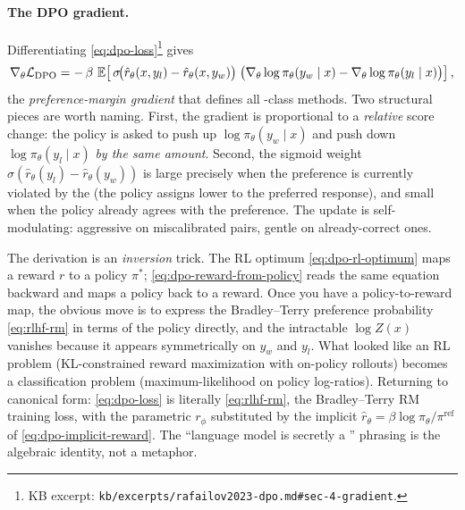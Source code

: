 \paragraph{The DPO gradient.} Differentiating
\cref{eq:dpo-loss}\footnote{KB excerpt:
\texttt{kb/excerpts/rafailov2023-dpo.md\#sec-4-gradient}.} gives
\citep[\S 4]{rafailov2023-dpo}
\begin{equation}
\nabla_\theta \mathcal{L}_{\mathrm{DPO}}
  = -\, \beta\, \operatorname{\mathbb{E}}\!\left[\,
       \sigma\!\big(\hat{r}_\theta(x, y_l) - \hat{r}_\theta(x, y_w)\big)
       \;\big(\nabla_\theta \log \pi_\theta(y_w \mid x)
              - \nabla_\theta \log \pi_\theta(y_l \mid x)\big)
     \right],
\label{eq:dpo-gradient}
\end{equation}
the \emph{preference-margin gradient} that defines all -class
methods. Two structural pieces are worth naming. First, the gradient is
proportional to a \emph{relative} score change: the policy is asked to
push up $\log \pi_\theta(y_w \mid x)$ and push down
$\log \pi_\theta(y_l \mid x)$ \emph{by the same amount}. Second, the
sigmoid weight $\sigma(\hat r_\theta(y_l) - \hat r_\theta(y_w))$ is
large precisely when the preference is currently violated by the
 (the policy assigns lower  to the
preferred response), and small when the policy already agrees with the
preference. The update is self-modulating: aggressive on
miscalibrated pairs, gentle on already-correct ones.

\begin{intuition}
The  derivation is an \emph{inversion} trick. The RL optimum
\cref{eq:dpo-rl-optimum} maps a reward $r$ to a policy $\pi^*$;
\cref{eq:dpo-reward-from-policy} reads the same equation backward and
maps a policy back to a reward. Once you have a policy-to-reward map,
the obvious move is to express the Bradley--Terry preference
probability \cref{eq:rlhf-rm} in terms of the policy directly, and the
intractable $\log Z(x)$ vanishes because it appears symmetrically on
$y_w$ and $y_l$. What looked like an RL problem (KL-constrained reward
maximization with on-policy rollouts) becomes a classification problem
(maximum-likelihood on policy log-ratios). Returning to canonical form:
\cref{eq:dpo-loss} is literally \cref{eq:rlhf-rm}, the
Bradley--Terry RM training loss, with the parametric $r_\phi$
substituted by the implicit $\hat r_\theta = \beta \log \pi_\theta /
\pi^{\mathrm{ref}}$ of \cref{eq:dpo-implicit-reward}. The ``language
model is secretly a '' phrasing
\citep{rafailov2023-dpo} is the algebraic identity, not a metaphor.
\end{intuition}

